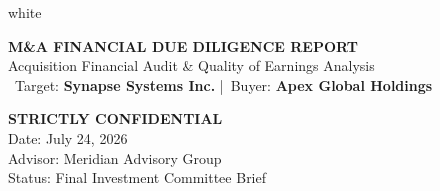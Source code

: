 \documentclass[10pt,a4paper,oneside]{scrreprt}
\begin{document}

\vspace*{-0.9cm}
\begin{color}{white}
\begin{minipage}[t]{0.65\textwidth}
  {\fontsize{14.5}{17}\selectfont\textbf{M\&A FINANCIAL DUE DILIGENCE REPORT}}\\[2pt]
  {\fontsize{9}{11.5}\selectfont\textcolor{IceGray}{Acquisition Financial Audit \& Quality of Earnings Analysis}} \\[4pt]
  {\small \faBuilding\ Target: \textbf{Synapse Systems Inc.} \quad|\quad \faBriefcase\ Buyer: \textbf{Apex Global Holdings}}
\end{minipage}%
\begin{minipage}[t]{0.35\textwidth}
  \raggedleft
  {\small \textbf{STRICTLY CONFIDENTIAL}}\\[2pt]
  {\small Date: July 24, 2026}\\[2pt]
  {\small Advisor: Meridian Advisory Group}\\[2pt]
  {\small Status: Final Investment Committee Brief}
\end{minipage}
\end{color}

\vspace{0.6cm}
\end{document}
